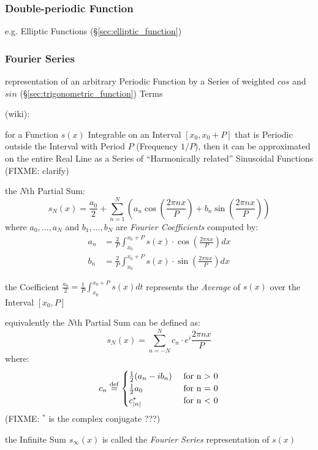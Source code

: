 \subsubsection{Double-periodic Function}\label{sec:double_periodic}

e.g. Elliptic Functions (\S\ref{sec:elliptic_function})



\subsubsection{Fourier Series}\label{sec:fourier_series}

representation of an arbitrary Periodic Function by a Series of weighted $cos$
and $sin$ (\S\ref{sec:trigonometric_function}) Terms

(wiki):

for a Function $s(x)$ Integrable on an Interval $[x_0,x_0 + P]$ that is
Periodic outside the Interval with Period $P$ (Frequency $1/P$), then it can be
approximated on the entire Real Line as a Series of ``Harmonically related''
Sinusoidal Functions (FIXME: clarify)

the $N$th Partial Sum:
\[
  s_N(x) = \frac{a_0}{2} + \sum_{n=1}^N \left(
    a_n\cos(\frac{2\pi{nx}}{P}) + b_n\sin(\frac{2\pi{nx}}{P})
  \right)
\]
where $a_0,\ldots,a_N$ and $b_1,\ldots,b_N$ are \emph{Fourier Coefficients}
computed by:
\begin{align*}
  a_n & = \frac{2}{P}\int_{x_0}^{x_0+P}s(x) \cdot \cos(\frac{2\pi{nx}}{P}) dx \\
  b_n & = \frac{2}{P}\int_{x_0}^{x_0+P}s(x) \cdot \sin(\frac{2\pi{nx}}{P}) dx
\end{align*}

the Coefficient $\frac{a_0}{2} = \frac{1}{P}\int_{x_0}^{x_0+P}s(x)dt$
represents the \emph{Average} of $s(x)$ over the Interval $[x_0,P]$

equivalently the $N$th Partial Sum can be defined as:
\[
  s_N(x) = \sum_{n=-N}^N c_n \cdot e^i\frac{2\pi{nx}}{P}
\]
where:
\[
  c_n \stackrel{\mathrm{def}}= \begin{cases}
    \frac{1}{2}(a_n - ib_n) &\ \text{for n > 0} \\
    \frac{1}{2}a_0          &\ \text{for n = 0} \\
    c_{|n|}^*               &\ \text{for n < 0}
  \end{cases}
\]
(FIXME: $^*$ is the complex conjugate ???)

the Infinite Sum $s_\infty(x)$ is called the \emph{Fourier Series}
representation of $s(x)$



